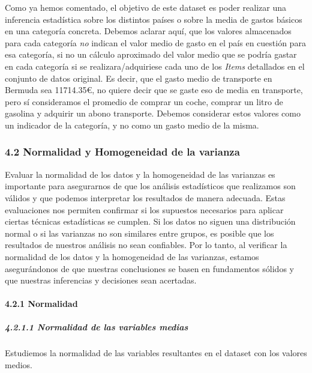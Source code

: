 \documentclass[
]{article}
\begin{document}
Como ya hemos comentado, el objetivo de este dataset es poder realizar
una inferencia estadística sobre los distintos países o sobre la media
de gastos básicos en una categoría concreta. Debemos aclarar aquí, que
los valores almacenados para cada categoría \emph{no} indican el valor
medio de gasto en el país en cuestión para esa categoría, si no un
cálculo aproximado del valor medio que se podría gastar en cada
categoría si se realizara/adquiriese cada uno de los \emph{Items}
detallados en el conjunto de datos original. Es decir, que el gasto
medio de transporte en Bermuda sea 11714.35€, no quiere decir que se
gaste eso de media en transporte, pero sí consideramos el promedio de
comprar un coche, comprar un litro de gasolina y adquirir un abono
transporte. Debemos considerar estos valores como un indicador de la
categoría, y no como un gasto medio de la misma.

\hypertarget{normalidad-y-homogeneidad-de-la-varianza}{%
\subsubsection{4.2 Normalidad y Homogeneidad de la
varianza}\label{normalidad-y-homogeneidad-de-la-varianza}}

Evaluar la normalidad de los datos y la homogeneidad de las varianzas es
importante para asegurarnos de que los análisis estadísticos que
realizamos son válidos y que podemos interpretar los resultados de
manera adecuada. Estas evaluaciones nos permiten confirmar si los
supuestos necesarios para aplicar ciertas técnicas estadísticas se
cumplen. Si los datos no siguen una distribución normal o si las
varianzas no son similares entre grupos, es posible que los resultados
de nuestros análisis no sean confiables. Por lo tanto, al verificar la
normalidad de los datos y la homogeneidad de las varianzas, estamos
asegurándonos de que nuestras conclusiones se basen en fundamentos
sólidos y que nuestras inferencias y decisiones sean acertadas.

\hypertarget{normalidad}{%
\paragraph{4.2.1 Normalidad}\label{normalidad}}

\hypertarget{normalidad-de-las-variables-medias}{%
\subparagraph{4.2.1.1 Normalidad de las variables
medias}\label{normalidad-de-las-variables-medias}}

\hfill\break

Estudiemos la normalidad de las variables resultantes en el dataset con
los valores medios.
\end{document}
